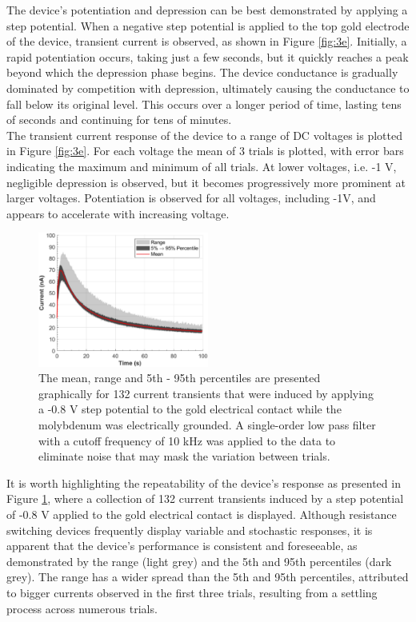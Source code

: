 \noindent The device's potentiation and depression can be best demonstrated by applying a step potential. When a negative step potential is applied to the top gold electrode of the device, transient current is observed, as shown in Figure \ref{fig:3e}. Initially, a rapid potentiation occurs, taking just a few seconds, but it quickly reaches a peak beyond which the depression phase begins. The device conductance is gradually dominated by competition with depression, ultimately causing the conductance to fall below its original level.  This occurs over a longer period of time, lasting tens of seconds and continuing for tens of minutes.\\

\noindent The transient current response of the device to a range of DC voltages is plotted in Figure \ref{fig:3e}. For each voltage the mean of 3 trials is plotted, with error bars indicating the maximum and minimum of all trials. At lower voltages, i.e. -1 V, negligible depression is observed, but it becomes progressively more prominent at larger voltages. Potentiation is observed for all voltages, including -1V, and appears to accelerate with increasing voltage.\\

\begin{figure}[htbp!] 
\centering    
\includegraphics[width=0.5\textwidth]{Chapter3/Figs/3f.png}
\caption[Repeatability of current transients in the sub-threshold range.]{The mean, range and 5th - 95th percentiles are presented graphically for 132 current transients that were induced by applying a -0.8 V step potential to the gold electrical contact while the molybdenum was electrically grounded. A single-order low pass filter with a cutoff frequency of 10 kHz was applied to the data to eliminate noise that may mask the variation between trials.}
\label{fig:3f}
\end{figure}

\noindent It is worth highlighting the repeatability of the device's response as presented in Figure \ref{fig:3f}, where a collection of 132 current transients induced by a step potential of -0.8 V applied to the gold electrical contact is displayed. Although resistance switching devices frequently display variable and stochastic responses, it is apparent that the device's performance is consistent and foreseeable, as demonstrated by the range (light grey) and the 5th and 95th percentiles (dark grey). The range has a wider spread than the 5th and 95th percentiles, attributed to bigger currents observed in the first three trials, resulting from a settling process across numerous trials.\\

